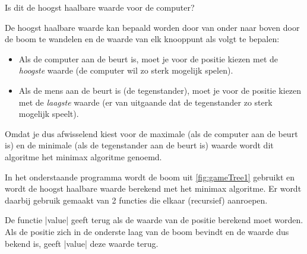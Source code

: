 \begin{cpplstShortInline}
Is dit de hoogst haalbare waarde voor de computer?

De hoogst haalbare waarde kan bepaald worden door van onder naar boven door de boom te wandelen en de waarde van elk knooppunt als volgt te bepalen:
\begin{itemize}
	\item Als de computer aan de beurt is, moet je voor de positie kiezen met de \emph{hoogste} waarde (de computer wil zo sterk mogelijk spelen).
	\item Als de mens aan de beurt is (de tegenstander), moet je voor de positie kiezen met de \emph{laagste} waarde (er van uitgaande dat de tegenstander zo sterk mogelijk speelt).
\end{itemize} 
Omdat je dus afwisselend kiest voor de maximale (als de computer aan de beurt is) en de minimale (als de tegenstander aan de beurt is) waarde wordt dit algoritme het minimax algoritme genoemd.

In het onderstaande programma  wordt de boom uit \cref{fig:gameTree1} gebruikt en wordt de hoogst haalbare waarde berekend met het minimax algoritme.
Er wordt daarbij gebruik gemaakt van 2 functies die elkaar (recursief) aanroepen.


De functie |value| geeft  terug als de waarde van de positie berekend moet worden.
Als de positie zich in de onderste laag van de boom bevindt en de waarde dus bekend is, geeft |value| deze waarde terug.

\newcommand{\chooseComputerMove}[1]{\hcode{cho\\-ose_\\-com\\-puter_\\-move(#1)}}
\newcommand{\chooseHumanMove}[1]{\hcode{cho\\-ose_\\-hu\\-man_\\-move\\-(#1)}}
\newcommand{\functievalue}[1]{functie \hcode{va\\-lue\\-(#1)}}
\newcommand{\valueelement}[1]{\hcode[mathescape]{va\\-lue\\-[#1]}}


\end{cpplstShortInline}
